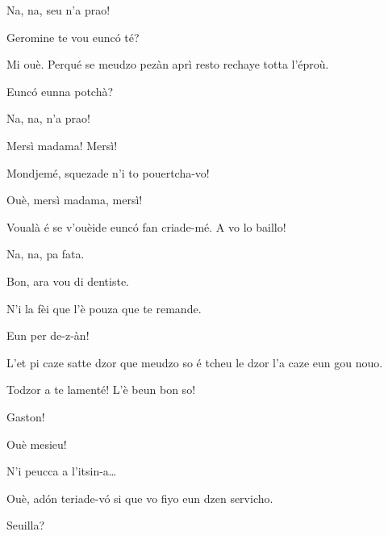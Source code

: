\begin{drama}
\Casimirspeaks Na, na, seu n'a prao!

\Fernandaspeaks{} Geromine te vou eunc\'o té?

\Gerominespeaks Mi ouè. Perqué se meudzo pezàn aprì resto rechaye totta l'éproù.


\Fernandaspeaks  Eunc\'o eunna potchà?

\Gerominespeaks  Na, na, n'a prao!


\Fernandaspeaks{} Mersì madama! Mersì!


\Fernandaspeaks Mondjemé, squezade n'i to pouertcha-vo!

\Gerominespeaks{} Ouè, mersì madama, mersì!

\Fernandaspeaks Voualà é se v'ouèide eunc\'o fan criade-mé. A vo lo baillo!

\Gerominespeaks Na, na, pa fata.

\Fernandaspeaks Bon, ara vou di dentiste.

\Casimirspeaks N'i la fèi que l'è pouza que te remande.

\Fernandaspeaks  Eun per de-z-àn!


\Gerominespeaks L’et pi caze satte dzor que meudzo so é tcheu le dzor l’a caze eun gou nouo.

\Casimirspeaks Todzor a te lamenté! L'è beun bon so!

\PersEmpourtantaspeaks {} Gaston!

\Eunfeurmispeaks Ouè mesieu!

\PersEmpourtantaspeaks N’i peucca a l’itsin-a\ldots

\Eunfeurmispeaks Ouè, ad\'on teriade-v\'o si que vo fiyo eun dzen servicho.


\Eunfeurmispeaks Seuilla?


\end{drama}
